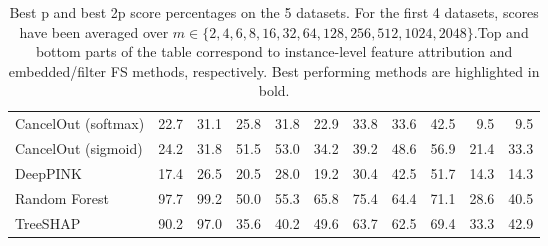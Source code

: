 \begin{table}[h!]
{{\begin{tabular}{lrrrrrrrrrr}
CancelOut (softmax) & 22.7 & 31.1 & 25.8 & 31.8 & 22.9 & 33.8 & 33.6 & 42.5 & 9.5 & 9.5 \\
CancelOut (sigmoid) & 24.2 & 31.8 & 51.5 & 53.0 & 34.2 & 39.2 & 48.6 & 56.9 & 21.4 & 33.3 \\
DeepPINK & 17.4 & 26.5 & 20.5 & 28.0 & 19.2 & 30.4 & 42.5 & 51.7 & 14.3 & 14.3 \\
Random Forest & 97.7 & 99.2 & 50.0 & 55.3 & 65.8 & 75.4 & 64.4 & 71.1 & 28.6 & 40.5 \\
TreeSHAP & 90.2 & 97.0 & 35.6 & 40.2 & 49.6 & 63.7 & 62.5 & 69.4 & 33.3 & 42.9 \\
\bottomrule
\end{tabular}}}{}
\caption{Best p and best 2p score percentages on the 5 datasets. For the first 4 datasets, scores have been averaged over $m \in \{2, 4, 6, 8, 16, 32, 64, 128, 256, 512, 1024, 2048\}$.Top and bottom parts of the table correspond to instance-level feature attribution and embedded/filter FS methods, respectively. Best performing methods are highlighted in bold.}
\end{table}
